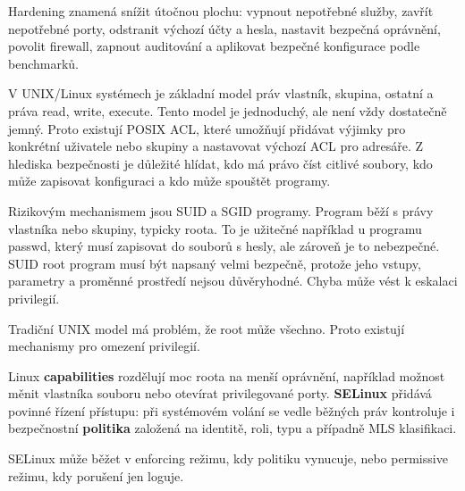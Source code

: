 Hardening znamená snížit útočnou plochu: vypnout nepotřebné služby, zavřít nepotřebné porty, odstranit výchozí účty a hesla, nastavit bezpečná oprávnění, povolit firewall, zapnout auditování a aplikovat bezpečné konfigurace podle benchmarků.

V UNIX/Linux systémech je základní model práv vlastník, skupina, ostatní a práva read, write, execute. Tento model je jednoduchý, ale není vždy dostatečně jemný. Proto existují POSIX ACL, které umožňují přidávat výjimky pro konkrétní uživatele nebo skupiny a nastavovat výchozí ACL pro adresáře. Z hlediska bezpečnosti je důležité hlídat, kdo má právo číst citlivé soubory, kdo může zapisovat konfiguraci a kdo může spouštět programy.

Rizikovým mechanismem jsou SUID a SGID programy. Program běží s právy vlastníka nebo skupiny, typicky roota. To je užitečné například u programu passwd, který musí zapisovat do souborů s hesly, ale zároveň je to nebezpečné. SUID root program musí být napsaný velmi bezpečně, protože jeho vstupy, parametry a proměnné prostředí nejsou důvěryhodné. Chyba může vést k eskalaci privilegií.

Tradiční UNIX model má problém, že root může všechno. Proto existují mechanismy pro omezení privilegií.

Linux \textbf{capabilities} rozdělují moc roota na menší oprávnění, například možnost měnit vlastníka souboru nebo otevírat privilegované porty. \textbf{SELinux} přidává povinné řízení přístupu: při systémovém volání se vedle běžných práv kontroluje i bezpečnostní \textbf{politika} založená na identitě, roli, typu a případně MLS klasifikaci.

SELinux může běžet v enforcing režimu, kdy politiku vynucuje, nebo permissive režimu, kdy porušení jen loguje.

